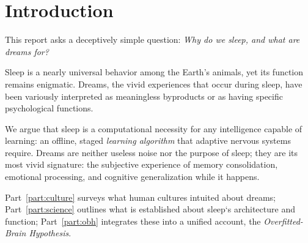 \chapter*{Introduction}\label{ch:introduction}

This report asks a deceptively simple question: \emph{Why do we sleep, and what are dreams for?} 

Sleep is a nearly universal behavior among the Earth's animals, yet its function remains enigmatic. Dreams, the vivid experiences that occur during sleep, have been variously interpreted as meaningless byproducts or as having specific psychological functions.

We argue that sleep is a computational necessity for any intelligence capable of learning: an offline, staged \emph{learning algorithm} that adaptive nervous systems require. Dreams are neither useless noise nor the purpose of sleep; they are its most vivid signature: the subjective experience of memory consolidation, emotional processing, and cognitive generalization while it happens. 

Part~\ref{part:culture} surveys what human cultures intuited about dreams; Part~\ref{part:science} outlines what is established about sleep`s architecture and function; Part~\ref{part:obh} integrates these into a unified account, the \emph{Overfitted-Brain Hypothesis}.
